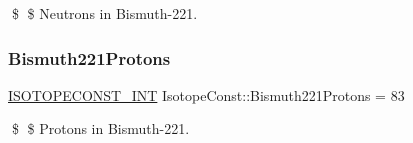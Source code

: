 \$ \$ Neutrons in Bismuth-\/221. \mbox{\label{group___isotope_const-_bismuth-_bi221_ga93a34e60a929fdcfaa62815798a17a2d}} 
\subsubsection{\texorpdfstring{Bismuth221\+Protons}{Bismuth221Protons}}
{\footnotesize\ttfamily \mbox{\hyperlink{group___isotope_const-_macros_ga5f18360b3e99483a35c32d789e62621c}{I\+S\+O\+T\+O\+P\+E\+C\+O\+N\+S\+T\+\_\+\+I\+NT}} Isotope\+Const\+::\+Bismuth221\+Protons = 83}

\$ \$ Protons in Bismuth-\/221. 